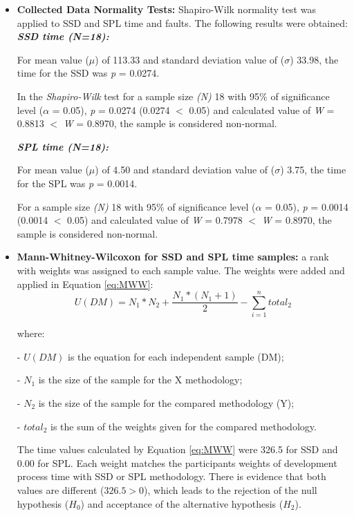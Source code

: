 \begin{itemize}
\setlength\itemsep{0.8em}

\item \textbf{Collected Data Normality Tests:} Shapiro-Wilk \cite{shaphirowilk65} normality test was applied to SSD and SPL time and faults. The following results were obtained:\\

\textbf{\textit{SSD time (\textit{N}=18):}}

For mean value ($\mu$) of 113.33 and standard deviation value of ($\sigma$) 33.98, the time for the SSD was \textit{p} = 0.0274.

In the \textit{Shapiro-Wilk} test for a sample size \textit{(N)} 18 with 95\% of significance level ($\alpha$ = 0.05), \textit{p} = 0.0274 (0.0274 $<$ 0.05) and calculated value of \textit{W} = 0.8813 $<$ \textit{W} = 0.8970, the sample is considered non-normal.

\textbf{\textit{SPL time (\textit{N}=18):}}

For mean value ($\mu$) of 4.50 and standard deviation value of ($\sigma$) 3.75, the time for the SPL was \textit{p} = 0.0014.

For a sample size \textit{(N)} 18 with 95\% of significance level ($\alpha$ = 0.05), \textit{p} = 0.0014 (0.0014 $<$ 0.05) and calculated value of \textit{W} = 0.7978 $<$ \textit{W} = 0.8970, the sample is considered non-normal.

\item \textbf{Mann-Whitney-Wilcoxon for SSD and SPL time samples:} a rank with weights was assigned to each sample value. The weights were added and applied in Equation \ref{eq:MWW}:
\small
\begin{equation}
\label{eq:MWW}
U(DM) = N_1 * N_2 + \frac{N_1*(N_1+1)}{2} - \sum_{i=1}^{n} total_{2}
\end{equation}
\normalsize 

where:

- \textit{$U(DM)$} is the equation for each independent sample (DM);

- \textit{$N_1$} is the size of the sample for the X methodology;

- \textit{$N_2$} is the size of the sample for the compared methodology (Y);

- \textit{$total_{2}$} is the sum of the weights given for the compared methodology.
\normalsize 
\vspace{5mm}

The time values calculated by Equation \ref{eq:MWW} were 326.5 for SSD and 0.00 for SPL. Each weight matches the participants weights of development process time with SSD or SPL methodology. There is evidence that both values are different ($326.5>0$), which leads to the rejection of the null hypothesis ($H_0$) and acceptance of the alternative hypothesis ($H_{2}$).


\end{itemize}
